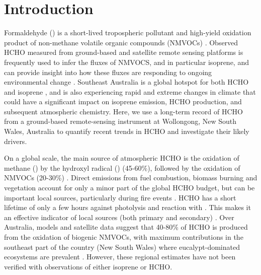 \documentclass[draft,linenumbers]{AGUJournal}
\begin{document}
\section{Introduction}

Formaldehyde () is a short-lived tropospheric pollutant and high-yield oxidation product of non-methane volatile organic compounds (NMVOCs) \citep{Pfister2008,Millet2008a,Franco2016}. Observed HCHO measured from ground-based and satellite remote sensing platforms is frequently used to infer the fluxes of NMVOCS, and in particular isoprene, and can provide insight into how these fluxes are responding to ongoing environmental change \citep{Abbot2003,Millet2008a,Barkley2009,Marais2012,Zhu2014}. Southeast Australia is a global hotspot for both HCHO and isoprene \citep{Pfister2008,Guenther1995,Stavrakou2009,Marais2012}, and is also experiencing rapid and extreme changes in climate \citep{Hughes2003,Murphy2008,IPCC2013B} that could have a significant impact on isoprene emission, HCHO production, and subsequent atmospheric chemistry. Here, we use a long-term record of HCHO from a ground-based remote-sensing instrument at Wollongong, New South Wales, Australia to quantify recent trends in HCHO and investigate their likely drivers.

On a global scale, the main source of atmospheric HCHO is the oxidation of methane () by the hydroxyl radical () (45-60\%), followed by the oxidation of NMVOCs (20-30\%) \citep{Pfister2008,Dufour2009,Stavrakou2009a,Franco2016}. Direct emissions from fuel combustion, biomass burning and vegetation account for only a minor part of the global HCHO budget, but can be important local sources, particularly during fire events \citep{Holzinger1999,Pfister2008,Dufour2009,Jones2009,Stavrakou2009,Stavrakou2009a,Fortems2012,Franco2016}. HCHO has a short lifetime of only a few hours against photolysis and reaction with   \citep{Fortems2012,Zeng2015}. This makes it an effective indicator of local sources (both primary and secondary) \citep{Jones2009,Palmer2001,Marais2012}. Over Australia, models and satellite data suggest that 40-80\% of HCHO is produced from the oxidation of biogenic NMVOCs, with maximum contributions in the southeast part of the country (New South Wales) where eucalypt-dominated ecosystems are prevalent \citep{Pfister2008,Franco2016,Dufour2009}. However, these regional estimates have not been verified with observations of either isoprene or HCHO.
\end{document}
